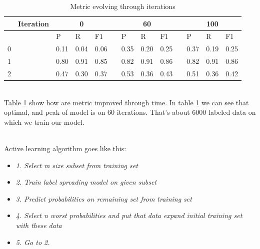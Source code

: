 \documentclass[10pt, a4paper]{article}
\begin{document}
\begin{table}[b]
	\centering
	\caption{Metric evolving through iterations}
	\label{tbl:metrics}
	\begin{tabular}{|lllllllllll|l|l|}
		\hline
		& Iteration             & \multicolumn{3}{c}{0}                                                             &                       & \multicolumn{3}{c}{60}                                                            &                       & \multicolumn{3}{c|}{100} \\ \hline
		\multicolumn{1}{|l|}{}  & \multicolumn{1}{l|}{} & \multicolumn{1}{l|}{P}    & \multicolumn{1}{l|}{R}    & \multicolumn{1}{l|}{F1}   & \multicolumn{1}{l|}{} & \multicolumn{1}{l|}{P}    & \multicolumn{1}{l|}{R}    & \multicolumn{1}{l|}{F1}   & \multicolumn{1}{l|}{} & P      & R      & F1     \\ \hline
		\multicolumn{1}{|l|}{0} & \multicolumn{1}{l|}{} & \multicolumn{1}{l|}{0.11} & \multicolumn{1}{l|}{0.04} & \multicolumn{1}{l|}{0.06} & \multicolumn{1}{l|}{} & \multicolumn{1}{l|}{0.35} & \multicolumn{1}{l|}{0.20} & \multicolumn{1}{l|}{0.25} & \multicolumn{1}{l|}{} & 0.37   & 0.19   & 0.25   \\ \hline
		\multicolumn{1}{|l|}{1} & \multicolumn{1}{l|}{} & \multicolumn{1}{l|}{0.80} & \multicolumn{1}{l|}{0.91} & \multicolumn{1}{l|}{0.85} & \multicolumn{1}{l|}{} & \multicolumn{1}{l|}{0.82} & \multicolumn{1}{l|}{0.91} & \multicolumn{1}{l|}{0.86} & \multicolumn{1}{l|}{} & 0.82   & 0.91   & 0.86   \\ \hline
		\multicolumn{1}{|l|}{2} & \multicolumn{1}{l|}{} & \multicolumn{1}{l|}{0.47} & \multicolumn{1}{l|}{0.30} & \multicolumn{1}{l|}{0.37} & \multicolumn{1}{l|}{} & \multicolumn{1}{l|}{0.53} & \multicolumn{1}{l|}{0.36} & \multicolumn{1}{l|}{0.43} & \multicolumn{1}{l|}{} & 0.51   & 0.36   & 0.42   \\ \hline
	\end{tabular}
\end{table}

\\Table \ref{tbl:metrics} show how are metric improved through time. In table \ref{tbl:metrics} we can see that optimal, and peak of model is on $60$ iterations. That's about $6000$ labeled data on which we train our model.

\\Active learning algorithm goes like this:
\begin{itemize}
	\item \textit{1. Select m size subset from training set}
	\item \textit{2. Train label spreading model on given subset}
	\item \textit{3. Predict probabilities on remaining set from training set}
	\item \textit{4. Select n worst probabilities and put that data expand initial training set with these data}
	\item \textit{5. Go to 2.}
\end{itemize}



 
\end{document}
